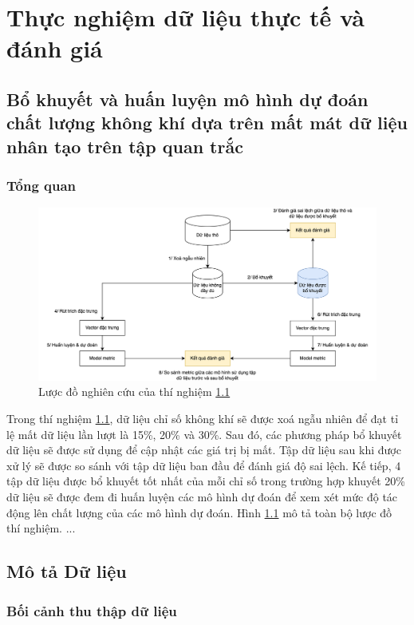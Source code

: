 \chapter{Thực nghiệm dữ liệu thực tế và đánh giá}
\section{Bổ khuyết và huấn luyện mô hình dự đoán chất lượng không khí dựa trên mất mát dữ liệu nhân tạo trên tập quan trắc}\label{ex-1}
\subsection{Tổng quan}
\begin{figure}[h]
    \centering
    \includegraphics[width=\linewidth]{image/section6_1/experiment.drawio.png}
    \caption{Lược đồ nghiên cứu của thí nghiệm \ref{ex-1}}
    \label{fig:section6_1-experiment}
\end{figure}
Trong thí nghiệm \ref{ex-1}, dữ liệu chỉ số không khí sẽ được xoá ngẫu nhiên để đạt tỉ lệ mất dữ liệu lần lượt là 15\%, 20\% và 30\%. Sau đó, các phương pháp bổ khuyết dữ liệu sẽ được sử dụng để cập nhật các giá trị bị mất. Tập dữ liệu sau khi được xử lý sẽ được so sánh với tập dữ liệu ban đầu để đánh giá độ sai lệch. Kế tiếp, 4 tập dữ liệu được bổ khuyết tốt nhất của mỗi chỉ số trong trường hợp khuyết 20\% dữ liệu sẽ được đem đi huấn luyện các mô hình dự đoán để xem xét mức độ tác động lên chất lượng của các mô hình dự đoán. Hình \ref{fig:section6_1-experiment} mô tả toàn bộ lược đồ thí nghiệm.
...

\section{Mô tả Dữ liệu}

\subsection{Bối cảnh thu thập dữ liệu}

